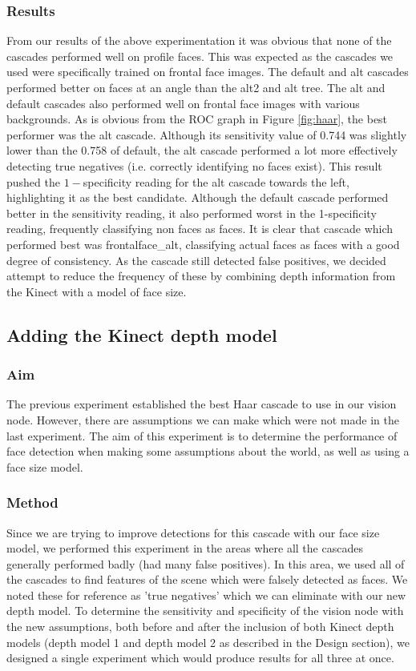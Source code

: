 \documentclass[conference]{IEEEtran}
\begin{document}
\subsubsection{Results}
From our results of the above experimentation it was obvious that none of the cascades performed well on profile faces. This was expected as the cascades we used were specifically trained on frontal face images. The default and alt cascades performed better on faces at an angle than the alt2 and alt tree. The alt and default cascades also performed well on frontal face images with various backgrounds. As is obvious from the ROC graph in Figure \ref{fig:haar}, the best performer was the alt cascade. Although its sensitivity value of 0.744 was slightly  lower than the 0.758 of default, the alt cascade performed a lot more effectively detecting true negatives (i.e. correctly identifying no faces exist). This result pushed the $1-$specificity reading for the alt cascade towards the left, highlighting it as the best candidate. Although the default cascade performed better in the sensitivity reading, it also performed worst in the 1-specificity reading, frequently classifying non faces as faces. It is clear that cascade which performed best was frontalface\_alt, classifying actual faces as faces with a good degree of consistency. As the cascade still detected false positives, we decided attempt to reduce the frequency of these by combining depth information from the Kinect with a model of face size.
\subsection{Adding the Kinect depth model}
\subsubsection{Aim}
The previous experiment established the best Haar cascade to use in our vision node. However, there are assumptions we can make which were not made in the last experiment. The aim of this experiment is to determine the performance of face detection when making some assumptions about the world, as well as using a face size model.
\subsubsection{Method}
Since we are trying to improve detections for this cascade with our face size model, we performed this experiment in the areas where all the cascades generally performed badly (had many false positives). In this area, we used all of the cascades to find features of the scene which were falsely detected as faces. We noted these for reference as 'true negatives' which we can eliminate with our new depth model. To determine the sensitivity and specificity of the vision node with the new assumptions, both before and after the inclusion of both Kinect depth models (depth model 1 and depth model 2 as described in the Design section), we designed a single experiment which would produce results for all three at once.
\end{document}
